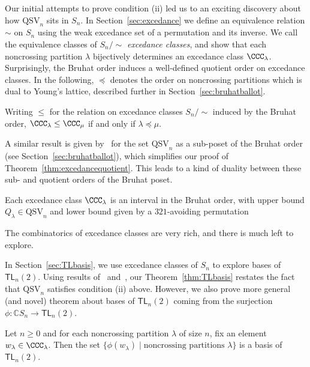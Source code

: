 \documentclass[12pt]{amsart}
\theoremstyle{definition}
\theoremstyle{remark}
\numberwithin{equation}{section}
\newenvironment{introthm}[1]{
  \renewcommand\theequation{#1}
  \thm
}{\endthm}
\newenvironment{introcor}[1]{
  \renewcommand\theequation{#1}
  \cor
}{\endcor}
\newcommand{\CC}{\mathbb{C}}
\newcommand{\TL}{\mathsf{TL}}
\newcommand{\QSV}{\mathrm{QSV}}
\begin{document}
Our initial attempts to prove condition (ii) led us to an exciting discovery about how $\QSV_{n}$ sits in $S_{n}$.  
In Section~\ref{sec:excedance} we define an equivalence relation $\sim$ on $S_{n}$ using the weak excedance set of a permutation and its inverse.  
We call the equivalence classes of $S_{n}\big/\!\!\sim$ \emph{excedance classes}, and show that each noncrossing partition $\lambda$ bijectively determines an excedance class $\CCC_{\lambda}$.  
Surprisingly, the Bruhat order induces a well-defined quotient order on excedance classes.  
In the following, $\preceq$ denotes the order on noncrossing partitions which is dual to Young's lattice, described further in Section~\ref{sec:bruhatballot}.

\begin{introthm}{\ref{thm:excedancequotient}}
Writing $\le$ for the relation on excedance classes $S_{n}\big/\!\! \sim$ induced by the Bruhat order, $\CCC_{\lambda} \le \CCC_{\mu}$ if and only if $\lambda \preceq \mu$.
\end{introthm}

A similar result is given by~\cite{GobetWilliams} for the set $\QSV_{n}$ as a sub-poset of the Bruhat order (see Section~\ref{sec:bruhatballot}), which simplifies our proof of Theorem~\ref{thm:excedancequotient}.  This leads to a kind of duality between these sub- and quotient orders of the Bruhat poset.

\begin{introcor}{\ref{cor:interval}}
Each excedance class $\CCC_{\lambda}$ is an interval in the Bruhat order, with upper bound $Q_{\lambda}\in \QSV_n$ and lower bound given by a $321$-avoiding permutation
\end{introcor}

The combinatorics of excedance classes are very rich, and there is much left to explore.   

In Section~\ref{sec:TLbasis}, we use excedance classes of $S_{n}$ to explore bases of $\TL_{n}(2)$.  Using results of~\cite{GobetWilliams} and~\cite{Zinno}, our Theorem~\ref{thm:TLbasis} restates the fact that $\QSV_{n}$ satisfies condition (ii) above.  However, we also prove more general (and novel) theorem about bases of $\TL_{n}(2)$ coming from the surjection $\phi: \CC S_{n} \to \TL_{n}(2)$.

\begin{introthm}{\ref{thm:TLbases}}
Let $n \ge 0$ and for each noncrossing partition $\lambda$ of size $n$, fix an element $w_{\lambda} \in \CCC_{\lambda}$. Then the set $\{\phi(w_{\lambda}) \;|\; \text{noncrossing partitions $\lambda$}\}$ is a basis of $\TL_{n}(2)$.
\end{introthm}
\end{document}
